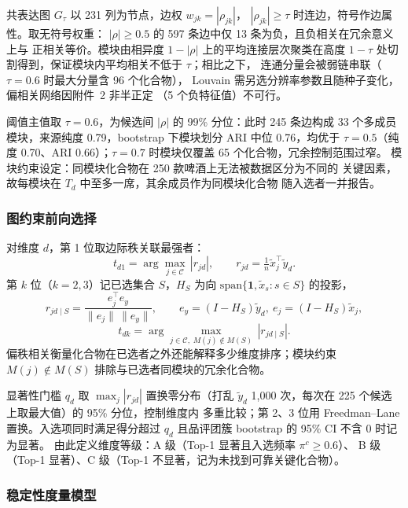 \documentclass[12pt,a4paper]{article}
\begin{document}
共表达图 $G_\tau$ 以 231 列为节点，边权 $w_{jk}=|\rho_{jk}|$，
$|\rho_{jk}|\ge\tau$ 时连边，符号作边属性。取无符号权重：
$|\rho|\ge0.5$ 的 597 条边中仅 13 条为负，且负相关在冗余意义上与
正相关等价。模块由相异度 $1-|\rho|$ 上的平均连接层次聚类在高度
$1-\tau$ 处切割得到，保证模块内平均相关不低于 $\tau$；相比之下，
连通分量会被弱链串联（$\tau=0.6$ 时最大分量含 96 个化合物），
Louvain 需另选分辨率参数且随种子变化，偏相关网络因附件~2 非半正定
（5 个负特征值）不可行。

阈值主值取 $\tau=0.6$，为候选间 $|\rho|$ 的 99\% 分位：此时 245
条边构成 33 个多成员模块，来源纯度 0.79，bootstrap 下模块划分 ARI
中位 0.76，均优于 $\tau=0.5$（纯度 0.70、ARI 0.66）；$\tau=0.7$
时模块仅覆盖 65 个化合物，冗余控制范围过窄。
模块约束设定：同模块化合物在 250 款啤酒上无法被数据区分为不同的
关键因素，故每模块在 $T_d$ 中至多一席，其余成员作为同模块化合物
随入选者一并报告。

\subsubsection{图约束前向选择}

对维度 $d$，第 1 位取边际秩关联最强者：
\begin{equation}
  t_{d1}=\arg\max_{j\in\mathcal C}\,|r_{jd}|,\qquad
  r_{jd}=\tfrac1n\tilde x_j^\top\tilde y_d .
\end{equation}
第 $k$ 位（$k=2,3$）记已选集合 $S$，$H_S$ 为向
$\mathrm{span}\{\mathbf 1,\tilde x_s:s\in S\}$ 的投影，
\begin{equation}
  r_{jd\mid S}=\frac{e_j^\top e_y}{\|e_j\|\,\|e_y\|},\qquad
  e_y=(I-H_S)\tilde y_d,\ e_j=(I-H_S)\tilde x_j,
\end{equation}
\begin{equation}
  t_{dk}=\arg\max_{j\in\mathcal C,\;M(j)\notin M(S)}\,|r_{jd\mid S}| .
\end{equation}
偏秩相关衡量化合物在已选者之外还能解释多少维度排序；模块约束
$M(j)\notin M(S)$ 排除与已选者同模块的冗余化合物。

显著性门槛 $q_d$ 取 $\max_j|r_{jd}|$ 置换零分布（打乱 $\tilde y_d$
1{,}000 次，每次在 225 个候选上取最大值）的 95\% 分位，控制维度内
多重比较；第 2、3 位用 Freedman--Lane 置换。入选项同时满足得分超过
$q_d$ 且品评团簇 bootstrap 的 95\% CI 不含 0 时记为显著。
由此定义维度等级：A 级（Top-1 显著且入选频率 $\pi^c\ge0.6$）、
B 级（Top-1 显著）、C 级（Top-1 不显著，记为未找到可靠关键化合物）。

\subsubsection{稳定性度量模型}
\end{document}
